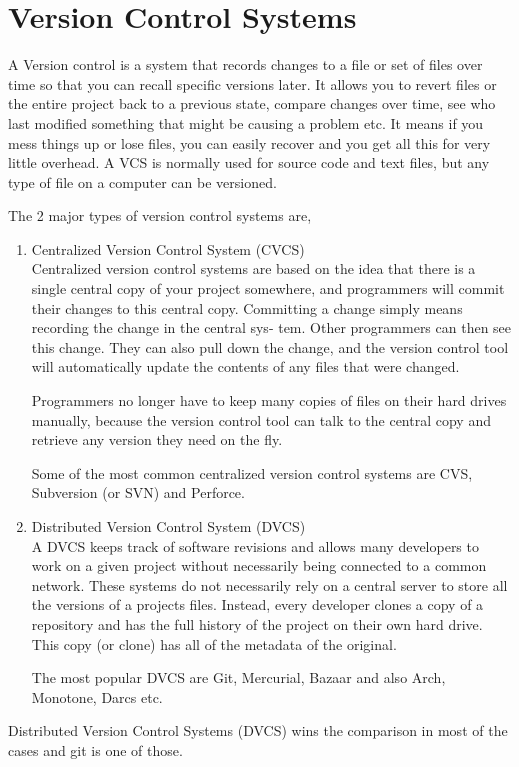 \section{Version Control Systems}

A Version control is a system that records changes to a file or set of
files over time so that you can recall specific versions later. It
allows you to revert files or the entire project back to a previous
state, compare changes over time, see who last modified something that
might be causing a problem etc. It means if you mess things up or lose
files, you can easily recover and you get all this for very little
overhead. A VCS is normally used for source code and
text files, but any type of file on a computer can be versioned.

The 2 major types of version control systems are,

\begin{enumerate}

\item{Centralized Version Control System (CVCS)}  \hfill \\

  Centralized version control systems are based on the idea that there
  is a single central copy of your project somewhere, and programmers
  will commit their changes to this central copy. Committing a change
  simply means recording the change in the central sys- tem. Other
  programmers can then see this change. They can also pull down the
  change, and the version control tool will automatically update the
  contents of any files that were changed.

  Programmers no longer have to keep many copies of files on their
  hard drives manually, because the version control tool can talk to
  the central copy and retrieve any version they need on the fly.

  Some of the most common centralized version control systems are CVS,
  Subversion (or SVN) and Perforce.

\item{Distributed Version Control System (DVCS)}  \hfill \\
  A DVCS keeps track of software revisions and allows many developers
  to work on a given project without necessarily being connected to a
  common network. These systems do not necessarily rely on a central
  server to store all the versions of a projects files. Instead, every
  developer clones a copy of a repository and has the full history of
  the project on their own hard drive. This copy (or clone) has all of
  the metadata of the original.

  The most popular DVCS are Git, Mercurial, Bazaar and also Arch,
  Monotone, Darcs etc.
\end{enumerate}

Distributed Version Control Systems (DVCS) wins the comparison in most
of the cases and git is one of those.
